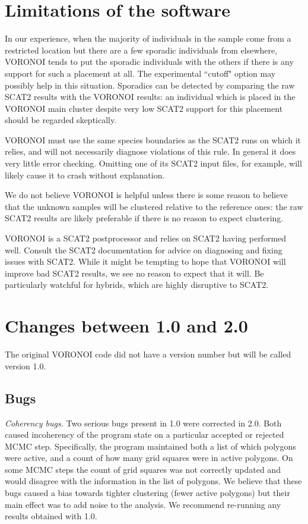 \documentclass[10pt,titlepage,times,letterpaper]{article}
\begin{document}
\section{Limitations of the software} \label{limitations}

In our experience, when the majority of individuals in the sample come from a restricted
location but there are a few sporadic individuals from elsewhere, VORONOI tends to put
the sporadic individuals with the others if there is any support for such a placement at
all.  The experimental ``cutoff" option may possibly help in this situation.   Sporadics
can be detected by comparing the raw SCAT2 results with the VORONOI results:  an individual
which is placed in the VORONOI main cluster despite very low SCAT2 support for this placement
should be regarded skeptically.

VORONOI must use the same species boundaries as the SCAT2 runs on which it relies, and
will not necessarily diagnose violations of this rule.  In general it does very little error
checking.  Omitting one of its SCAT2 input files, for example, will likely cause it to
crash without explanation.

We do not believe VORONOI is helpful unless there is some reason to believe that the
unknown samples will be clustered relative to the reference ones:  the raw SCAT2 results
are likely preferable if there is no reason to expect clustering.

VORONOI is a SCAT2 postprocessor and relies on SCAT2 having performed well.
Consult the SCAT2 documentation for advice on diagnosing and fixing issues with SCAT2.
While it might be tempting to hope that VORONOI will improve bad SCAT2 results, we
see no reason to expect that it will.  Be particularly watchful for hybrids, which are
highly disruptive to SCAT2.

\section{Changes between 1.0 and 2.0}

The original VORONOI code did not have a version number but will be called version 1.0.

\subsection{Bugs}

{\it Coherency bugs.}  Two serious bugs present in 1.0 were corrected in 2.0.  Both 
caused incoherency of the program state on a particular accepted or rejected MCMC
step.  Specifically, the program maintained both a list of which polygons were
active, and a count of how many grid squares were in active polygons.
On some MCMC steps the count of grid squares was not correctly updated and would
disagree with the information in the list of polygons.  We believe that these bugs 
caused a bias towards tighter clustering (fewer active polygons) but their main effect was
to add noise to the analysis.  We recommend re-running any results obtained with 1.0.
\end{document}
